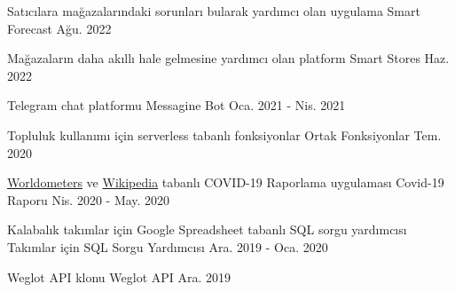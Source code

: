 

\begin{cventries}

  \cventry
    {Satıcılara mağazalarındaki sorunları bularak yardımcı olan uygulama} %
    {Smart Forecast} %
    {} %
    {Ağu. 2022} %
    {}

  \cventry
    {Mağazaların daha akıllı hale gelmesine yardımcı olan platform} %
    {Smart Stores} %
    {} %
    {Haz. 2022} %
    {}

  \cventry
    {Telegram chat platformu} %
    {Messagine Bot} %
    {} %
    {Oca. 2021 - Nis. 2021} %
    {}

  \cventry
    {Topluluk kullanımı için serverless tabanlı fonksiyonlar} %
    {Ortak Fonksiyonlar} %
    {} %
    {Tem. 2020} %
    {}

  \cventry
    {\href{https://www.worldometers.info/coronavirus}{Worldometers} ve \href{https://en.wikipedia.org/wiki/COVID-19_pandemic}{Wikipedia} tabanlı COVID-19 Raporlama uygulaması} %
    {Covid-19 Raporu} %
    {} %
    {Nis. 2020 - May. 2020} %
    {}

  \cventry
    {Kalabalık takımlar için Google Spreadsheet tabanlı SQL sorgu yardımcısı} %
    {Takımlar için SQL Sorgu Yardımcısı} %
    {} %
    {Ara. 2019 - Oca. 2020} %
    {}

  \cventry
    {Weglot API klonu} %
    {Weglot API} %
    {} %
    {Ara. 2019} %
    {}


\end{cventries}
